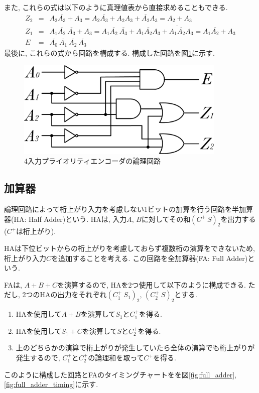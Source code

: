 \documentclass[titlepage]{jsarticle}
\begin{document}
    また, これらの式は以下のように真理値表から直接求めることもできる.
    \begin{eqnarray*}
      Z_2 &=& A_2 \overline{A_3} + A_3 =
        A_2 \overline{A_3} + A_2A_3 + \overline{A_2}A_3 =
        A_2 + A_3 \\
      Z_1 &=& A_1 \overline{A_2} \ \overline{A_3} + A_3 =
        A_1 \overline{A_2} \ \overline{A_3} + A_1 \overline{A_2}A_3 +
          \overline{A_1 \overline{A_2}} A_3 =
        A_1 \overline{A_2} + A_3 \\
      E &=& \overline{A_0} \ \overline{A_1} \ \overline{A_2} \ \overline{A_3}
    \end{eqnarray*}
    最後に, これらの式から回路を構成する.
    構成した回路を図\ref{fig:priority_encoder}に示す.
    \begin{figure}[h]
      \centering
      \includegraphics[width=10cm]{images/priority.pdf}
      \caption{4入力プライオリティエンコーダの論理回路}
      \label{fig:priority_encoder}
    \end{figure}
  \subsection{加算器} \label{subsec:FA}
    論理回路によって桁上がり入力を考慮しない1ビットの加算を行う回路を半加算器(HA: Half Adder)という.
    HAは, 入力$A$, $B$に対してその和$(C^+ \ S)_2$を出力する($C^+$は桁上がり).

    HAは下位ビットからの桁上がりを考慮しておらず複数桁の演算をできないため,
    桁上がり入力$C$を追加することを考える.
    この回路を全加算器(FA: Full Adder)という.

    FAは, $A + B + C$を演算するので, HAを2つ使用して以下のように構成できる.
    ただし, 2つのHAの出力をそれぞれ$(C_1^+ \ S_1)_2$, $(C_2^+ \ S)_2$とする.
    \begin{enumerate}
      \item HAを使用して$A + B$を演算して$S_1$と$C_1^+$を得る.
      \item HAを使用して$S_1 + C$を演算して$S$と$C_2^+$を得る.
      \item 上のどちらかの演算で桁上がりが発生していたら全体の演算でも桁上がりが発生するので,
        $C_1^+$と$C_2^+$の論理和を取って$C^+$を得る.
    \end{enumerate}
    このように構成した回路とFAのタイミングチャートをを図\ref{fig:full_adder},
    \ref{fig:full_adder_timing}に示す.
\end{document}
